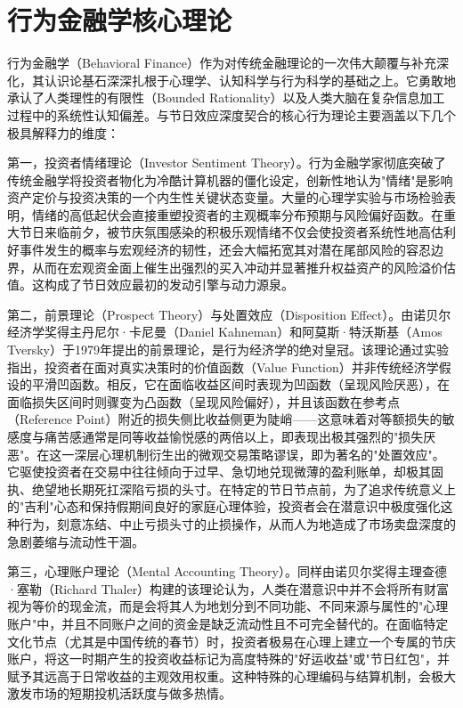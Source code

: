 \documentclass{cupb-thesis}
\begin{document}
\section{行为金融学核心理论}


行为金融学（Behavioral Finance）作为对传统金融理论的一次伟大颠覆与补充深化，其认识论基石深深扎根于心理学、认知科学与行为科学的基础之上。它勇敢地承认了人类理性的有限性（Bounded Rationality）以及人类大脑在复杂信息加工过程中的系统性认知偏差。与节日效应深度契合的核心行为理论主要涵盖以下几个极具解释力的维度：


第一，投资者情绪理论（Investor Sentiment Theory）。行为金融学家彻底突破了传统金融学将投资者物化为冷酷计算机器的僵化设定，创新性地认为"情绪"是影响资产定价与投资决策的一个内生性关键状态变量。大量的心理学实验与市场检验表明，情绪的高低起伏会直接重塑投资者的主观概率分布预期与风险偏好函数。在重大节日来临前夕，被节庆氛围感染的积极乐观情绪不仅会使投资者系统性地高估利好事件发生的概率与宏观经济的韧性，还会大幅拓宽其对潜在尾部风险的容忍边界，从而在宏观资金面上催生出强烈的买入冲动并显著推升权益资产的风险溢价估值。这构成了节日效应最初的发动引擎与动力源泉。


第二，前景理论（Prospect Theory）与处置效应（Disposition Effect）。由诺贝尔经济学奖得主丹尼尔·卡尼曼（Daniel Kahneman）和阿莫斯·特沃斯基（Amos Tversky）于1979年提出的前景理论，是行为经济学的绝对皇冠。该理论通过实验指出，投资者在面对真实决策时的价值函数（Value Function）并非传统经济学假设的平滑凹函数。相反，它在面临收益区间时表现为凹函数（呈现风险厌恶），在面临损失区间时则骤变为凸函数（呈现风险偏好），并且该函数在参考点（Reference Point）附近的损失侧比收益侧更为陡峭——这意味着对等额损失的敏感度与痛苦感通常是同等收益愉悦感的两倍以上，即表现出极其强烈的"损失厌恶"。在这一深层心理机制衍生出的微观交易策略谬误，即为著名的"处置效应"。它驱使投资者在交易中往往倾向于过早、急切地兑现微薄的盈利账单，却极其固执、绝望地长期死扛深陷亏损的头寸。在特定的节日节点前，为了追求传统意义上的"吉利"心态和保持假期间良好的家庭心理体验，投资者会在潜意识中极度强化这种行为，刻意冻结、中止亏损头寸的止损操作，从而人为地造成了市场卖盘深度的急剧萎缩与流动性干涸。


第三，心理账户理论（Mental Accounting Theory）。同样由诺贝尔奖得主理查德·塞勒（Richard Thaler）构建的该理论认为，人类在潜意识中并不会将所有财富视为等价的现金流，而是会将其人为地划分到不同功能、不同来源与属性的"心理账户"中，并且不同账户之间的资金是缺乏流动性且不可完全替代的。在面临特定文化节点（尤其是中国传统的春节）时，投资者极易在心理上建立一个专属的节庆账户，将这一时期产生的投资收益标记为高度特殊的"好运收益"或"节日红包"，并赋予其远高于日常收益的主观效用权重。这种特殊的心理编码与结算机制，会极大激发市场的短期投机活跃度与做多热情。
\end{document}
